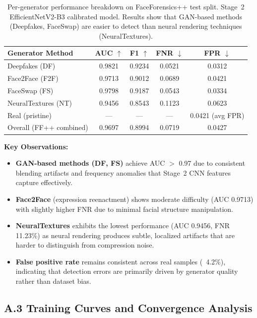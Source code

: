 \begin{table}[h]
  \centering
  \caption{Per-generator performance breakdown on FaceForensics++ test split. Stage~2 EfficientNetV2-B3 calibrated model. Results show that GAN-based methods (Deepfakes, FaceSwap) are easier to detect than neural rendering techniques (NeuralTextures).}
  \label{tab:per_generator_appendix}
  {\small
  \begin{tabular}{@{}lcccc@{}}
    \toprule
    Generator Method & AUC $\uparrow$ & F1 $\uparrow$ & FNR $\downarrow$ & FPR $\downarrow$ \\
    \midrule
    Deepfakes (DF) & 0.9821 & 0.9234 & 0.0521 & 0.0312 \\
    Face2Face (F2F) & 0.9713 & 0.9012 & 0.0689 & 0.0421 \\
    FaceSwap (FS) & 0.9798 & 0.9187 & 0.0543 & 0.0334 \\
    NeuralTextures (NT) & 0.9456 & 0.8543 & 0.1123 & 0.0623 \\
    Real (pristine) & --- & --- & --- & 0.0421 (avg FPR) \\
    \midrule
    Overall (FF++ combined) & 0.9697 & 0.8994 & 0.0719 & 0.0427 \\
    \bottomrule
  \end{tabular}}
\end{table}

\textbf{Key Observations:}
\begin{itemize}[leftmargin=*,itemsep=2pt,parsep=0pt]
  \item \textbf{GAN-based methods (DF, FS)} achieve AUC $>$ 0.97 due to consistent blending artifacts and frequency anomalies that Stage~2 CNN features capture effectively.
  \item \textbf{Face2Face} (expression reenactment) shows moderate difficulty (AUC 0.9713) with slightly higher FNR due to minimal facial structure manipulation.
  \item \textbf{NeuralTextures} exhibits the lowest performance (AUC 0.9456, FNR 11.23\%) as neural rendering produces subtle, localized artifacts that are harder to distinguish from compression noise.
  \item \textbf{False positive rate} remains consistent across real samples (~4.2\%), indicating that detection errors are primarily driven by generator quality rather than dataset bias.
\end{itemize}

\subsection*{A.3 Training Curves and Convergence Analysis}

